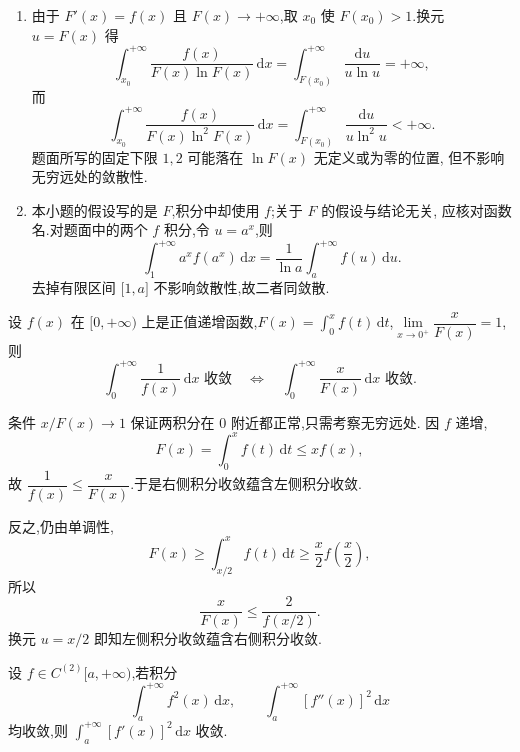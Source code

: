 \begin{solution}
  \leavevmode
  \begin{enumerate}
    \item 由于 $F'(x)=f(x)$ 且 $F(x)\to+\infty$,取 $x_0$ 使
          $F(x_0)>1$.换元 $u=F(x)$ 得
          \[
            \displaystyle\int_{x_0}^{+\infty}\dfrac{f(x)}{F(x)\ln F(x)}\,\mathrm{d}x
            =\int_{F(x_0)}^{+\infty}\dfrac{\mathrm{d}u}{u\ln u}=+\infty,
          \]
          而
          \[
            \displaystyle\int_{x_0}^{+\infty}\dfrac{f(x)}{F(x)\ln^2F(x)}\,\mathrm{d}x
            =\int_{F(x_0)}^{+\infty}\dfrac{\mathrm{d}u}{u\ln^2u}<+\infty.
          \]
          题面所写的固定下限 $1,2$ 可能落在 $\ln F(x)$ 无定义或为零的位置,
          但不影响无穷远处的敛散性.

    \item 本小题的假设写的是 $F$,积分中却使用 $f$;关于 $F$ 的假设与结论无关,
          应核对函数名.对题面中的两个 $f$ 积分,令 $u=a^x$,则
          \[
            \displaystyle\int_1^{+\infty}a^xf(a^x)\,\mathrm{d}x
            =\dfrac{1}{\ln a}\int_a^{+\infty}f(u)\,\mathrm{d}u.
          \]
          去掉有限区间 $\lbrack1,a\rbrack$ 不影响敛散性,故二者同敛散.
  \end{enumerate}
\end{solution}

\begin{example}
  设 $f(x)$ 在 $\lbrack 0,+\infty)$ 上是正值递增函数,$\displaystyle F(x)=\int_0^xf(t)\,\mathrm{d}t$,$\displaystyle\lim\limits_{x\to0^+}\dfrac{x}{F(x)}=1$,则
  \[
    \displaystyle\int_0^{+\infty}\dfrac{1}{f(x)}\,\mathrm{d}x\text{ 收敛}
    \quad\Longleftrightarrow\quad
    \int_0^{+\infty}\dfrac{x}{F(x)}\,\mathrm{d}x\text{ 收敛}.
  \]
\end{example}
\exampleblank

\begin{solution}
  条件 $x/F(x)\to1$ 保证两积分在 $0$ 附近都正常,只需考察无穷远处.
  因 $f$ 递增,
  \[
    F(x)=\int_0^xf(t)\,\mathrm{d}t\leq xf(x),
  \]
  故 $\dfrac{1}{f(x)}\leq\dfrac{x}{F(x)}$.于是右侧积分收敛蕴含左侧积分收敛.

  反之,仍由单调性,
  \[
    F(x)\geq\int_{x/2}^xf(t)\,\mathrm{d}t\geq\dfrac{x}{2}f\left(\dfrac{x}{2}\right),
  \]
  所以
  \[
    \dfrac{x}{F(x)}\leq\dfrac{2}{f(x/2)}.
  \]
  换元 $u=x/2$ 即知左侧积分收敛蕴含右侧积分收敛.
\end{solution}

\begin{example}
  设 $f\in C^{(2)}\lbrack a,+\infty)$,若积分
  \[
    \displaystyle\int_a^{+\infty}f^2(x)\,\mathrm{d}x,
    \qquad
    \int_a^{+\infty}[f''(x)]^2\,\mathrm{d}x
  \]
  均收敛,则 $\displaystyle\int_a^{+\infty}[f'(x)]^2\,\mathrm{d}x$ 收敛.
\end{example}
\exampleblank

